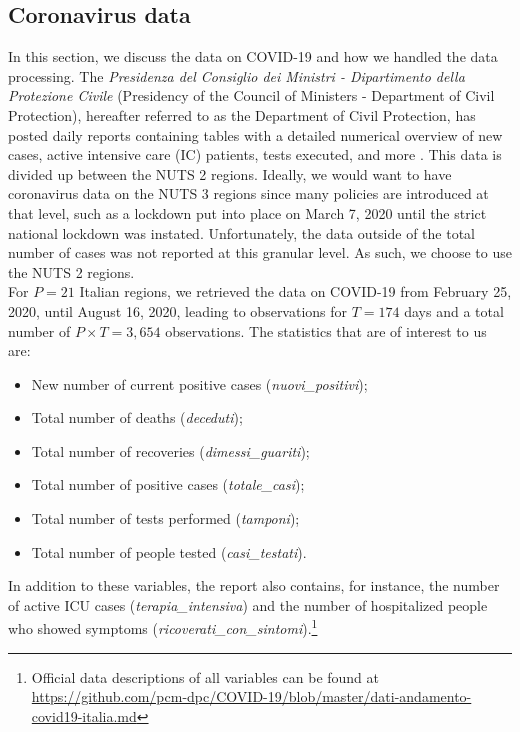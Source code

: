 \documentclass[12pt]{article}
\begin{document}
	\subsection{Coronavirus data} \label{subsec:coronavirus_data}
	In this section, we discuss the data on COVID-19 and how we handled the data processing. The \textit{Presidenza del Consiglio dei Ministri - Dipartimento della Protezione Civile} (Presidency of the Council of Ministers - Department of Civil Protection), hereafter referred to as the Department of Civil Protection, has posted daily reports containing tables with a detailed numerical overview of new cases, active intensive care (IC) patients, tests executed, and more \parencite{Rosini2020Github}. This data is divided up between the NUTS 2 regions. Ideally, we would want to have coronavirus data on the NUTS 3 regions since many policies are introduced at that level, such as a lockdown put into place on March 7, 2020 until the strict national lockdown was instated. Unfortunately, the data outside of the total number of cases was not reported at this granular level. As such, we choose to use the NUTS 2 regions. \\
	
	For $P = 21$ Italian regions, we retrieved the data on COVID-19 from February 25, 2020, until August 16, 2020, leading to observations for $T = 174$ days and a total number of $P \times T = 3,654$ observations. The statistics that are of interest to us are:
	\begin{itemize}
	    \item New number of current positive cases (\textit{nuovi\_positivi});
	    \item Total number of deaths (\textit{deceduti});
	    \item Total number of recoveries (\textit{dimessi\_guariti});
	    \item Total number of positive cases (\textit{totale\_casi});
	    \item Total number of tests performed (\textit{tamponi});
	    \item Total number of people tested (\textit{casi\_testati}).
	\end{itemize}
	
	In addition to these variables, the report also contains, for instance, the number of active ICU cases (\textit{terapia\_intensiva}) and the number of hospitalized people who showed symptoms (\textit{ricoverati\_con\_sintomi}).\footnote{Official data descriptions of all variables can be found at \url{https://github.com/pcm-dpc/COVID-19/blob/master/dati-andamento-covid19-italia.md}} \\
	
\end{document}
